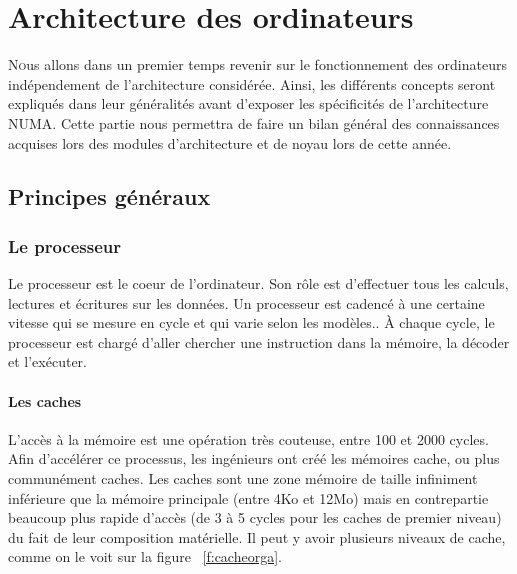 \chapter{Architecture des ordinateurs}

  \lettrine[nindent=0em,lines=3]{N} ous allons dans un premier temps revenir sur le fonctionnement des
  ordinateurs indépendement de l'architecture considérée. Ainsi, les différents
  concepts seront expliqués dans leur généralités avant d'exposer les
  spécificités de l'architecture NUMA. Cette partie nous permettra de faire un
  bilan général des connaissances acquises lors des modules d'architecture et de
  noyau lors de cette année.


  \section{Principes généraux}

    \subsection{Le processeur}

    Le processeur est le coeur de l'ordinateur.  Son rôle est d'effectuer tous
    les calculs, lectures et écritures sur les données. Un processeur est
    cadencé à une certaine vitesse qui se mesure en cycle et qui varie selon les
    modèles.. À chaque cycle, le processeur est chargé d'aller chercher une
    instruction dans la mémoire, la décoder et l'exécuter.

    \subsubsection{Les caches}

      L'accès à la mémoire est une opération très couteuse, entre 100 et 2000
      cycles\cite{Lepers2014}. Afin d'accélérer ce processus, les ingénieurs ont
      créé les mémoires cache, ou plus communément caches. Les caches sont une
      zone mémoire de taille infiniment inférieure que la mémoire principale
      (entre 4Ko et 12Mo) mais en contrepartie beaucoup plus rapide d'accès (de
      3 à 5 cycles pour les caches de premier niveau) du fait de leur
      composition matérielle. Il peut y avoir plusieurs niveaux de cache, comme
      on le voit sur la figure ~\ref{f:cacheorga}.


